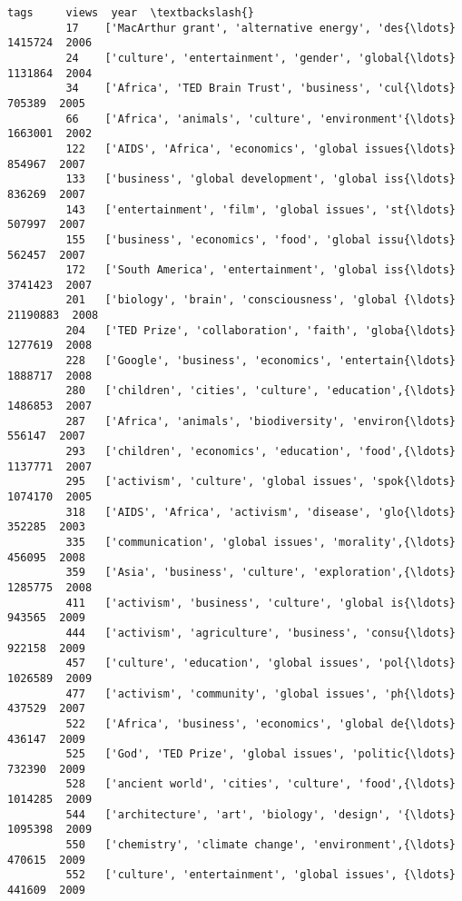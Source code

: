 \documentclass[11pt]{article}
\begin{document}
\begin{Verbatim}[commandchars=\\\{\}]
                                                            tags     views  year  \textbackslash{}
         17    ['MacArthur grant', 'alternative energy', 'des{\ldots}   1415724  2006   
         24    ['culture', 'entertainment', 'gender', 'global{\ldots}   1131864  2004   
         34    ['Africa', 'TED Brain Trust', 'business', 'cul{\ldots}    705389  2005   
         66    ['Africa', 'animals', 'culture', 'environment'{\ldots}   1663001  2002   
         122   ['AIDS', 'Africa', 'economics', 'global issues{\ldots}    854967  2007   
         133   ['business', 'global development', 'global iss{\ldots}    836269  2007   
         143   ['entertainment', 'film', 'global issues', 'st{\ldots}    507997  2007   
         155   ['business', 'economics', 'food', 'global issu{\ldots}    562457  2007   
         172   ['South America', 'entertainment', 'global iss{\ldots}   3741423  2007   
         201   ['biology', 'brain', 'consciousness', 'global {\ldots}  21190883  2008   
         204   ['TED Prize', 'collaboration', 'faith', 'globa{\ldots}   1277619  2008   
         228   ['Google', 'business', 'economics', 'entertain{\ldots}   1888717  2008   
         280   ['children', 'cities', 'culture', 'education',{\ldots}   1486853  2007   
         287   ['Africa', 'animals', 'biodiversity', 'environ{\ldots}    556147  2007   
         293   ['children', 'economics', 'education', 'food',{\ldots}   1137771  2007   
         295   ['activism', 'culture', 'global issues', 'spok{\ldots}   1074170  2005   
         318   ['AIDS', 'Africa', 'activism', 'disease', 'glo{\ldots}    352285  2003   
         335   ['communication', 'global issues', 'morality',{\ldots}    456095  2008   
         359   ['Asia', 'business', 'culture', 'exploration',{\ldots}   1285775  2008   
         411   ['activism', 'business', 'culture', 'global is{\ldots}    943565  2009   
         444   ['activism', 'agriculture', 'business', 'consu{\ldots}    922158  2009   
         457   ['culture', 'education', 'global issues', 'pol{\ldots}   1026589  2009   
         477   ['activism', 'community', 'global issues', 'ph{\ldots}    437529  2007   
         522   ['Africa', 'business', 'economics', 'global de{\ldots}    436147  2009   
         525   ['God', 'TED Prize', 'global issues', 'politic{\ldots}    732390  2009   
         528   ['ancient world', 'cities', 'culture', 'food',{\ldots}   1014285  2009   
         544   ['architecture', 'art', 'biology', 'design', '{\ldots}   1095398  2009   
         550   ['chemistry', 'climate change', 'environment',{\ldots}    470615  2009   
         552   ['culture', 'entertainment', 'global issues', {\ldots}    441609  2009   

\end{Verbatim}
\end{document}
